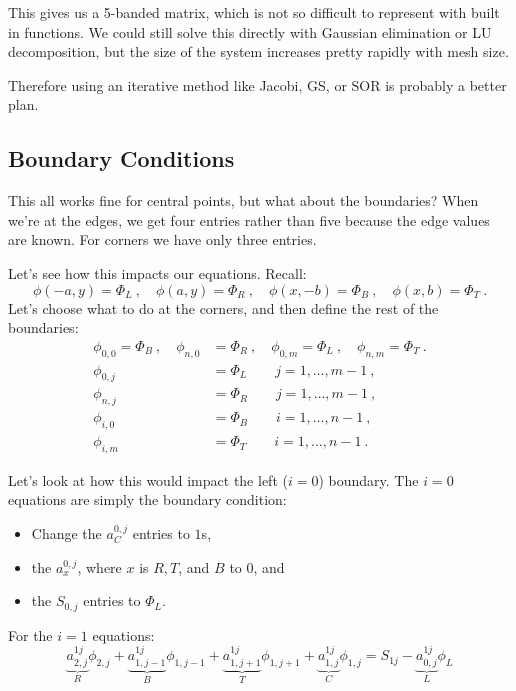 \documentclass[12pt]{article}
\begin{document}
This gives us a 5-banded matrix, which is not so difficult to represent with built in functions. We could still solve this directly with Gaussian elimination or LU decomposition, but the size of the system increases pretty rapidly with mesh size.

Therefore using an iterative method like Jacobi, GS, or SOR is probably a better plan. 


\subsection*{Boundary Conditions}

This all works fine for central points, but what about the boundaries? When we're at the edges, we get four entries rather than five because the edge values are known. For corners we have only three entries. 

Let's see how this impacts our equations. Recall:
%
\[\phi(-a,y) = \Phi_L\:, \quad \phi(a,y) = \Phi_R\:, \quad \phi(x,-b) = \Phi_B\:, \quad \phi(x,b) = \Phi_T\:.\]
%
Let's choose what to do at the corners, and then define the rest of the boundaries:
%
\begin{align}
\phi_{0,0} = \Phi_B\:, \quad \phi_{n,0} &= \Phi_R\:, \quad \phi_{0,m} = \Phi_L\:, \quad \phi_{n,m} = \Phi_T\:. \nonumber \\
\phi_{0,j} &= \Phi_L \qquad j=1,\dots,m-1 \:, \nonumber \\
\phi_{n,j} &= \Phi_R \qquad j=1,\dots,m-1 \:, \nonumber \\
\phi_{i,0} &= \Phi_B \qquad i=1,\dots,n-1 \:, \nonumber \\
\phi_{i,m} &= \Phi_T \qquad i=1,\dots,n-1 \:. \nonumber 
\end{align}

Let's look at how this would impact the left ($i=0$) boundary. The $i=0$ equations are simply the boundary condition:
\begin{itemize}
\item Change the $a_{C}^{0,j}$ entries to $1$s, 
\item the $a_{x}^{0,j}$, where $x$ is $R, T$, and $B$ to $0$, and 
\item the $S_{0,j}$ entries to $\Phi_L$.
\end{itemize} 

For the $i=1$ equations:
\[\underbrace{a_{2,j}^{1j}}_{R}\phi_{2,j} + \underbrace{a_{1,j-1}^{1j}}_{B}\phi_{1,j-1} + \underbrace{a_{1,j+1}^{1j}}_{T}\phi_{1,j+1} + \underbrace{a_{1,j}^{1j}}_{C}\phi_{1,j} = S_{1j} - \underbrace{a_{0,j}^{1j}}_{L}\phi_L \]
\end{document}
